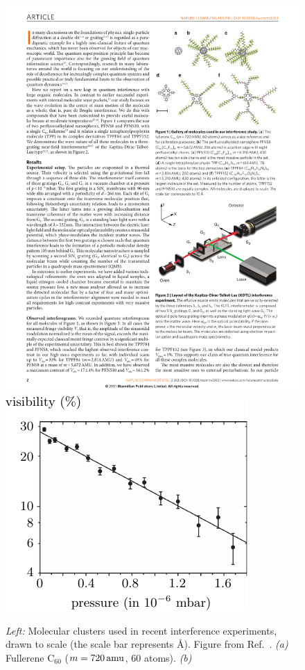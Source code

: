 \documentclass[aps,pra,reprint,amsmath,amssymb,showpacs,nofootinbib,floatfix,onecolumn,12pt]{revtex4-1}
\begin{document}
\begin{figure}[t]
\centering
\vspace{.cm}
\includegraphics[scale=0.85]{clusters.pdf}\qquad\includegraphics[scale=1]{vis.pdf}
\caption{\emph{Left:} Molecular clusters used in recent interference experiments, drawn to scale (the scale bar represents \unit[10]{\AA}). Figure from Ref.~\cite{Gerlich:2011:aa}. \emph{(a)} Fullerene C$_{60}$ ($m = \unit[720]{amu}$, 60 atoms). \emph{(b)}
}
\end{figure}
\end{document}
